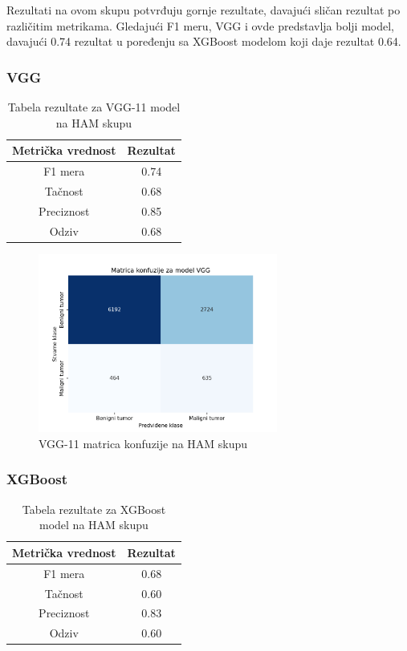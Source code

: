 \documentclass{article}
\begin{document}
Rezultati na ovom skupu potvrđuju gornje rezultate, davajući sličan rezultat po različitim metrikama. Gledajući F1 meru, VGG i ovde predstavlja bolji model, davajući 0.74 rezultat u poređenju sa XGBoost modelom koji daje rezultat 0.64.

\subsubsection{VGG}

\begin{table}[H]
    \centering
    \begin{tabular}{|c|c|}
        \hline
        \textbf{Metrička vrednost} & \textbf{Rezultat} \\ \hline
        F1 mera & 0.74 \\ \hline
        Tačnost & 0.68 \\ \hline
        Preciznost & 0.85 \\ \hline
        Odziv & 0.68 \\ \hline
    \end{tabular}
    \caption{Tabela rezultate za VGG-11 model na HAM skupu}
    \label{tab:xgboost_performance}
\end{table}

\begin{figure}[H]
    \centering
    \includegraphics[width=0.7\textwidth]{rezultati/VGG_HAM_matrica_konfuzije.png} 
    \caption{VGG-11 matrica konfuzije na HAM skupu} 
    \label{VGG HAM matrica konfuzije}
\end{figure}

\subsubsection{XGBoost}
\begin{table}[H]
    \centering
    \begin{tabular}{|c|c|}
        \hline
        \textbf{Metrička vrednost} & \textbf{Rezultat} \\ \hline
        F1 mera & 0.68 \\ \hline
        Tačnost & 0.60 \\ \hline
        Preciznost & 0.83 \\ \hline
        Odziv & 0.60 \\ \hline
    \end{tabular}
    \caption{Tabela rezultate za XGBoost model na HAM skupu}
    \label{tab:XGbBoost rezultati na HAM skupu}
\end{table}
\end{document}
